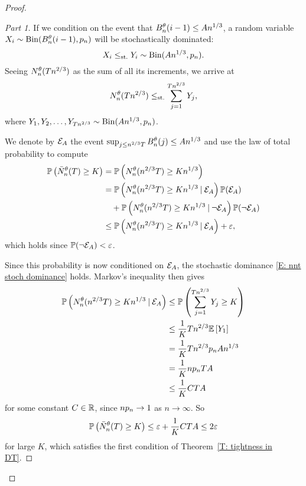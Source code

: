 \begin{proof}
\begin{proof}[Part 1]
If we condition on the event that $B_n^{\theta}(i-1) \leq An^{1 / 3}$, a random variable $X_i \sim \operatorname*{Bin}(B_n^{\theta}(i-1), p_n)$ will be stochastically dominated:
\begin{equation} \label{E: stoch dom.}
X_i \leq_{\text{st.}} Y_i \sim \operatorname*{Bin}(An^{1 / 3}, p_n).
\end{equation}
Seeing $N_n^{\theta}(Tn^{2 / 3})$ as the sum of all its increments, we arrive at
\begin{equation} \label{E: nnt stoch dominance}
N_n^{\theta}(Tn^{2 / 3}) \leq_{\text{st.}} \sum_{j=1}^{Tn^{2 / 3}} Y_j,
\end{equation}
where $Y_1, Y_2, \dots, Y_{Tn^{2 / 3}} \sim \operatorname*{Bin}(An^{1 / 3}, p_n)$.

We denote by $\mathcal{E}_{A}$ the event $\sup_{j \leq n^{2 / 3}T} B_n^{\theta}(j) \leq An^{1 / 3}$ and use the law of total probability to compute
\begin{equation} \label{E: First Total Probability Argument}
\begin{aligned}
\mathbb{P}\left(\bar{N}_n^{\theta}(T) \geq K\right) 
&= \mathbb{P}\left(N_n^{\theta}(n^{2 / 3}T) \geq Kn^{1 / 3}\right) \\
&=  \mathbb{P}\left(N_n^{\theta}(n^{2 / 3}T) \geq Kn^{1 / 3} \: | \: \mathcal{E}_{A}\right) \mathbb{P}(\mathcal{E}_{A}) \\
&\quad + \mathbb{P}\left(N_n^{\theta}(n^{2 / 3}T) \geq Kn^{1 / 3} \: | \: \neg\mathcal{E}_{A}\right) \mathbb{P}(\neg \mathcal{E}_{A}) \\
&\leq \mathbb{P}\left(N_n^{\theta}(n^{2 / 3}T) \geq Kn^{1 / 3} \: | \: \mathcal{E}_{A}\right) + \varepsilon, \\
\end{aligned}	
\end{equation}
which holds since $\mathbb{P}(\neg\mathcal{E}_{A}) <\varepsilon$.

Since this probability is now conditioned on $\mathcal{E}_{A}$, the stochastic dominance \eqref{E: nnt stoch dominance} holds.
Markov's inequality then gives
\begin{align*}
\mathbb{P}\left(N_n^{\theta}(n^{2 / 3}T) \geq Kn^{1 / 3} \: | \: \mathcal{E}_{A}\right) 
&\leq \mathbb{P}\left( \sum_{j=1}^{Tn^{2 / 3}} Y_j \geq K\right) \\
&\leq \frac{1}{K}Tn^{2 / 3} \mathbb{E} \left[ Y_1 \right] \\
&= \frac{1}{K}Tn^{2 / 3} p_n An^{1 / 3} \\
&= \frac{1}{K}np_n TA \\
&\leq \frac{1}{K}CTA
\end{align*}
for some constant $C \in \mathbb{R}$, since $np_n \rightarrow 1$ as $n \rightarrow \infty$.
So
\begin{equation*}
\mathbb{P}\left(\bar{N}_n^{\theta}(T) \geq K\right) \leq \varepsilon + \frac{1}{K}CTA \leq 2 \varepsilon
\end{equation*}
for large $K$, which satisfies the first condition of Theorem~\ref{T: tightness in DT}.


\end{proof}
\end{proof}
